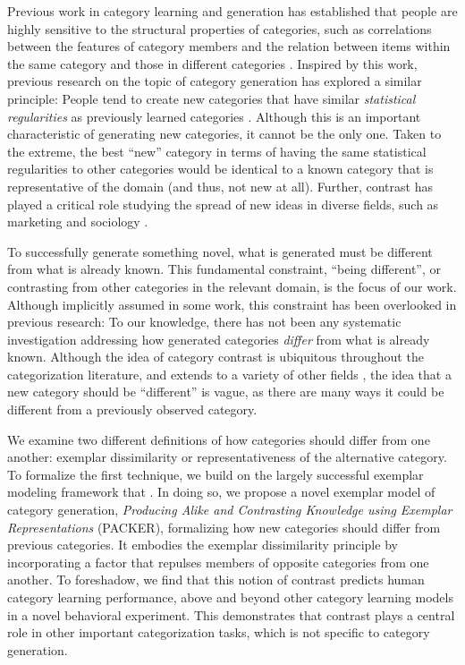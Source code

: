 \documentclass[12pt]{article}
\begin{document}
\begin{flushleft}
Previous work in category learning and generation has established that people
are highly sensitive to the structural properties of categories, such as
correlations between the features of category members and the relation between
items within the same category and those in different categories
\citep{roschmervis1975,regier2007,shepard1961learning,smith1995creative}.
Inspired by this work, previous research on the topic of category generation has
explored a similar principle: People tend to create new categories that have
similar {\em statistical regularities} as previously learned categories
\citep{jern2013probabilistic,ward1994structured}. Although this is an important
characteristic of generating new categories, it cannot be the only one. Taken to
the extreme, the best ``new'' category in terms of having the same statistical
regularities to other categories would be identical to a known category that is
representative of the domain (and thus, not new at all). Further, contrast has
played a critical role studying the spread of new ideas in diverse fields, such
as marketing \citep{berger16} and sociology \citep{rogers03}.

To successfully generate something novel, what is generated must be different
from what is already known. This fundamental constraint, ``being different'', or
contrasting from other categories in the relevant domain, is the focus of our
work. Although implicitly assumed in some work, this constraint has been
overlooked in previous research: To our knowledge, there has not been any
systematic investigation addressing how generated categories {\em differ} from
what is already known. Although the idea of category contrast is ubiquitous
throughout the categorization literature, and extends to a variety of other
fields \citep[e.g., color;][]{regier2007}, the idea that a new category should
be ``different'' is vague, as there are many ways it could be different from a
previously observed category.

We examine two different definitions of how categories should differ from one
another: exemplar dissimilarity or representativeness of the alternative
category. To formalize the first technique, we build on the largely successful
exemplar modeling framework that
\citep{medin1978context,nosofsky1984choice,nosofsky1986attention}. In doing so,
we propose a novel exemplar model of category generation, {\em Producing Alike
  and Contrasting Knowledge using Exemplar Representations} (PACKER),
formalizing how new categories should differ from previous categories. It
embodies the exemplar dissimilarity principle by incorporating a factor that
repulses members of opposite categories from one another. To foreshadow, we find
that this notion of contrast predicts human category learning performance, above
and beyond other category learning models in a novel behavioral experiment. This
demonstrates that contrast plays a central role in other important
categorization tasks, which is not specific to category generation.


\end{flushleft}
\end{document}
